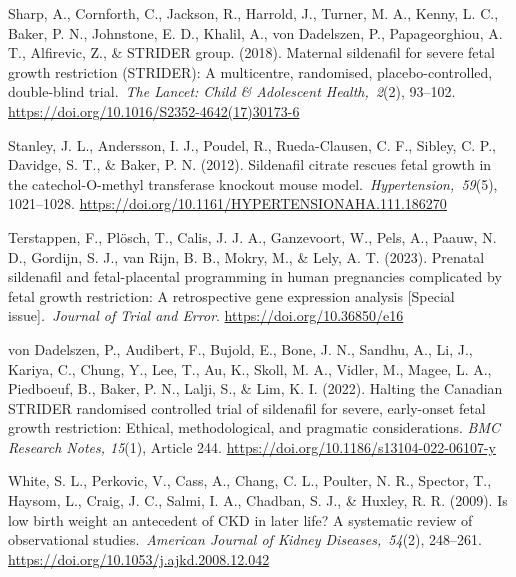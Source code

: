 \documentclass[authordate, reflection]{jote-new-article}
\begin{document}
	Sharp, A., Cornforth, C., Jackson, R., Harrold, J., Turner, M. A., Kenny, L. C., Baker, P. N., Johnstone, E. D., Khalil, A., von Dadelszen, P., Papageorghiou, A. T., Alfirevic, Z., \& STRIDER group. (2018). Maternal sildenafil for severe fetal growth restriction (STRIDER): A multicentre, randomised, placebo-controlled, double-blind trial. \emph{The Lancet: Child \& Adolescent Health, 2}(2), 93--102. \url{https://doi.org/10.1016/S2352-4642(17)30173-6}



	Stanley, J. L., Andersson, I. J., Poudel, R., Rueda-Clausen, C. F., Sibley, C. P., Davidge, S. T., \& Baker, P. N. (2012). Sildenafil citrate rescues fetal growth in the catechol-O-methyl transferase knockout mouse model. \emph{Hypertension, 59}(5), 1021--1028. \url{https://doi.org/10.1161/HYPERTENSIONAHA.111.186270}







	Terstappen, F., Plösch, T., Calis, J. J. A., Ganzevoort, W., Pels, A., Paauw, N. D., Gordijn, S. J., van Rijn, B. B., Mokry, M., \& Lely, A. T. (2023). Prenatal sildenafil and fetal-placental programming in human pregnancies complicated by fetal growth restriction: A retrospective gene expression analysis [Special issue]\emph{. Journal of Trial and Error}. \url{https://doi.org/10.36850/e16}







	von Dadelszen, P., Audibert, F., Bujold, E., Bone, J. N., Sandhu, A., Li, J., Kariya, C., Chung, Y., Lee, T., Au, K., Skoll, M. A., Vidler, M., Magee, L. A., Piedboeuf, B., Baker, P. N., Lalji, S., \& Lim, K. I. (2022). Halting the Canadian STRIDER randomised controlled trial of sildenafil for severe, early-onset fetal growth restriction: Ethical, methodological, and pragmatic considerations. \emph{BMC Research Notes, 15}(1), Article 244. \url{https://doi.org/10.1186/s13104-022-06107-y}







	White, S. L., Perkovic, V., Cass, A., Chang, C. L., Poulter, N. R., Spector, T., Haysom, L., Craig, J. C., Salmi, I. A., Chadban, S. J., \& Huxley, R. R. (2009). Is low birth weight an antecedent of CKD in later life? A systematic review of observational studies. \emph{American Journal of Kidney Diseases, 54}(2), 248--261. \url{https://doi.org/10.1053/j.ajkd.2008.12.042}
\end{document}
